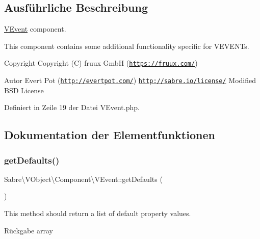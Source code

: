 \subsection{Ausführliche Beschreibung}
\mbox{\hyperlink{class_sabre_1_1_v_object_1_1_component_1_1_v_event}{V\+Event}} component.

This component contains some additional functionality specific for V\+E\+V\+E\+NT\textquotesingle{}s.

\begin{DoxyCopyright}{Copyright}
Copyright (C) fruux GmbH (\href{https://fruux.com/}{\tt https\+://fruux.\+com/}) 
\end{DoxyCopyright}
\begin{DoxyAuthor}{Autor}
Evert Pot (\href{http://evertpot.com/}{\tt http\+://evertpot.\+com/})  \href{http://sabre.io/license/}{\tt http\+://sabre.\+io/license/} Modified B\+SD License 
\end{DoxyAuthor}


Definiert in Zeile 19 der Datei V\+Event.\+php.



\subsection{Dokumentation der Elementfunktionen}
\mbox{\label{class_sabre_1_1_v_object_1_1_component_1_1_v_event_af7f3b1c7d63bf9834f7722248db12b8a}} 
\subsubsection{\texorpdfstring{get\+Defaults()}{getDefaults()}}
{\footnotesize\ttfamily Sabre\textbackslash{}\+V\+Object\textbackslash{}\+Component\textbackslash{}\+V\+Event\+::get\+Defaults (\begin{DoxyParamCaption}{ }\end{DoxyParamCaption})\hspace{0.3cm}{\ttfamily [protected]}}

This method should return a list of default property values.

\begin{DoxyReturn}{Rückgabe}
array 
\end{DoxyReturn}


